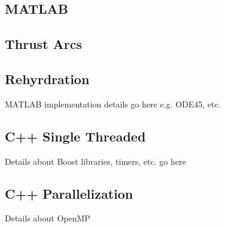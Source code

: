 \subsection{MATLAB}
\subsection{Thrust Arcs}
\subsection{Rehyrdration}
MATLAB implementation details go here e.g. ODE45, etc.
\subsection{C++ Single Threaded}
Details about Boost libraries, timers, etc. go here
\subsection{C++ Parallelization}
Details about OpenMP

\newpage